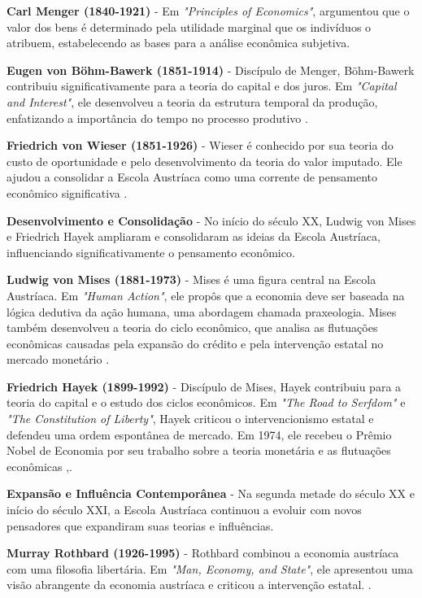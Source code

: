 \documentclass[article,12pt,oneside,a4paper,english,brazil]{unifil}
\begin{document}
\begin{Spacing}{1.5}
\textbf{Carl Menger (1840-1921)} - Em \textit{"Principles of Economics"}, \cite{menger1871principles} argumentou que o valor dos bens é determinado pela utilidade marginal que os indivíduos o atribuem, estabelecendo as bases para a análise econômica subjetiva.

\textbf{Eugen von Böhm-Bawerk (1851-1914)} - Discípulo de Menger, Böhm-Bawerk contribuiu significativamente para a teoria do capital e dos juros. Em \textit{"Capital and Interest"}, ele desenvolveu a teoria da estrutura temporal da produção, enfatizando a importância do tempo no processo produtivo \cite{bohm1884capital}.

\textbf{Friedrich von Wieser (1851-1926)} - Wieser é conhecido por sua teoria do custo de oportunidade e pelo desenvolvimento da teoria do valor imputado. Ele ajudou a consolidar a Escola Austríaca como uma corrente de pensamento econômico significativa \cite{bohm1884capital}.

\textbf{Desenvolvimento e Consolidação} -
No início do século XX, Ludwig von Mises e Friedrich Hayek ampliaram e consolidaram as ideias da Escola Austríaca, influenciando significativamente o pensamento econômico.

\textbf{Ludwig von Mises (1881-1973)} - Mises é uma figura central na Escola Austríaca. Em \textit{"Human Action"}, ele propôs que a economia deve ser baseada na lógica dedutiva da ação humana, uma abordagem chamada praxeologia. Mises também desenvolveu a teoria do ciclo econômico, que analisa as flutuações econômicas causadas pela expansão do crédito e pela intervenção estatal no mercado monetário \cite{mises1949human}.

\textbf{Friedrich Hayek (1899-1992)} - Discípulo de Mises, Hayek contribuiu para a teoria do capital e o estudo dos ciclos econômicos. Em \textit{"The Road to Serfdom"} e \textit{"The Constitution of Liberty"}, Hayek criticou o intervencionismo estatal e defendeu uma ordem espontânea de mercado. Em 1974, ele recebeu o Prêmio Nobel de Economia por seu trabalho sobre a teoria monetária e as flutuações econômicas \cite{hayek1944road},\cite{hayek1960constitution}.

\textbf{Expansão e Influência Contemporânea} -
Na segunda metade do século XX e início do século XXI, a Escola Austríaca continuou a evoluir com novos pensadores que expandiram suas teorias e influências.

\textbf{Murray Rothbard (1926-1995)} - Rothbard combinou a economia austríaca com uma filosofia libertária. Em \textit{"Man, Economy, and State"}, ele apresentou uma visão abrangente da economia austríaca e criticou a intervenção estatal. \cite{rothbard1962man}.


\end{Spacing}
\end{document}

